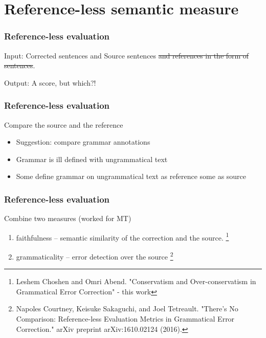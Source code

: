\documentclass{beamer}
\newcommand*\pooritem{%
	\item[\color{red}\scalebox{0.9}{\textbullet}]}
\newcommand*\gooditem{%
	\item[\color{blue}\scalebox{0.9}{\textbullet}]}
\begin{document}
\section{Reference-less semantic measure}
\begin{frame}
	\frametitle{Reference-less evaluation}
	Input: Corrected sentences and Source sentences \sout{and references in the form of sentences}.
	
	Output: A score, but which?!
\end{frame}
\begin{frame}
	\frametitle{Reference-less evaluation}
	Compare the source and the reference
	\begin{itemize}
		\gooditem Suggestion: compare grammar annotations
		\pooritem Grammar is ill defined with ungrammatical text
		\pooritem Some define grammar on ungrammatical text as reference some as source
	\end{itemize}
\end{frame}
\begin{frame}
	\frametitle{Reference-less evaluation}
	Combine two measures (worked for MT)
	\begin{enumerate}
		\item faithfulness -- semantic similarity of the correction and the source. \footnote{\tiny Leshem Choshen and Omri Abend. "Conservatism and Over-conservatism in Grammatical Error Correction" - this work}
		\item grammaticality -- error detection over the source \footnote{\tiny Napoles Courtney, Keisuke Sakaguchi, and Joel Tetreault. "There's No Comparison: Reference-less Evaluation Metrics in Grammatical Error Correction." arXiv preprint arXiv:1610.02124 (2016).}
	\end{enumerate}
\end{frame}
\end{document}
